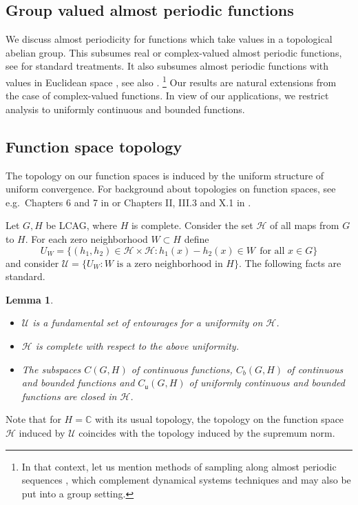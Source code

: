 \documentclass[11pt, a4wide]{amsart}
\newtheorem{lemma}{Lemma}
\numberwithin{lemma}{section}
\begin{document}
\begin{appendix}


\section{Group valued almost periodic functions}\label{app:gvap}

We discuss almost periodicity for functions which take values in a topological abelian group.
This subsumes real or complex-valued almost periodic functions, see \cite{B55,C68,K04} for standard treatments. It also subsumes almost periodic functions with values in Euclidean space \cite{Zai}, see also \cite[Sec.~33.26-27]{HR}.%
\footnote{In that context, let us mention methods of sampling along almost periodic sequences \cite{BHL}, which complement dynamical systems techniques and may also be put into a group setting.}
%
Our results are natural extensions from the case of complex-valued functions. In view of our applications, we restrict analysis to uniformly continuous and bounded functions. 




\subsection{Function space topology}

The topology on our function spaces is induced by the uniform structure of uniform convergence.   For background about topologies on function spaces, see e.g.~Chapters 6 and 7 in \cite{Kel} or Chapters II, III.3 and X.1 in \cite{Bou98}.

\medskip

Let $ G,H$ be LCAG, where $H$ is complete. Consider the set $\mathcal H$ of all maps from $G$ to $H$. For each zero neighborhood $W\subset H$ define
%
\begin{displaymath}
U_W=\{(h_1, h_2) \in \mathcal{H} \times \mathcal{H}: h_1(x) - h_2(x) \in W \ \ \mbox{for all $x \in G$}\}
\end{displaymath}
%
and consider  $\mathcal{U} = \{U_W: \text{$W$ is a zero neighborhood in $H$} \}$. The following facts are standard.

\begin{lemma}
\begin{itemize}
\item[(i)] $\mathcal{U}$ is a fundamental set of entourages for a uniformity on $\mathcal{H}$. 
\item[(ii)] $\mathcal{H}$ is complete with respect to the above uniformity.  
\item[(iii)] The subspaces $C(G,H)$ of continuous functions, $C_b(G,H)$ of continuous and bounded functions and $C_\mathsf{u}(G,H)$ of uniformly continuous and bounded functions are closed in $\mathcal{H}$.
\end{itemize}
\end{lemma}
%
Note that for $H=\mathbb C$ with its usual topology, the topology on the function space $\mathcal H$ induced by $\mathcal{U}$ coincides with the topology induced by the supremum norm.




\end{appendix}
\end{document}
